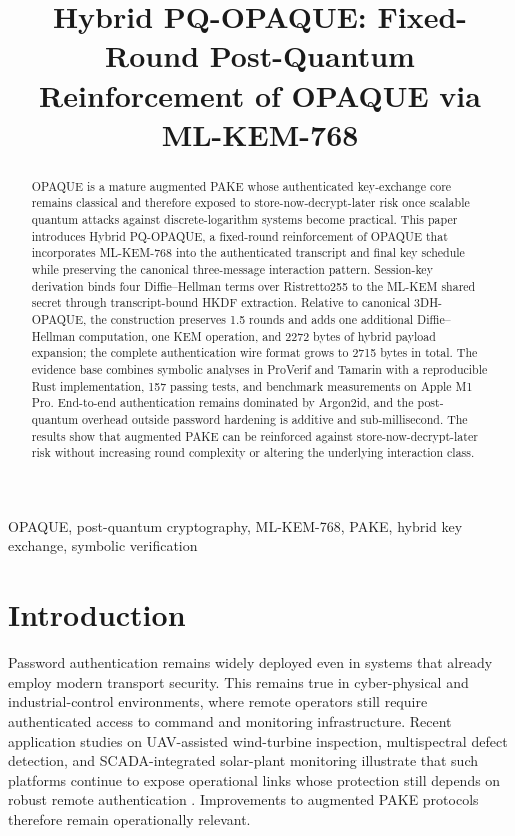 \documentclass[conference]{IEEEtran}
\begin{document}
\title{Hybrid PQ-OPAQUE: Fixed-Round Post-Quantum Reinforcement of OPAQUE via ML-KEM-768}

\author{
}

\maketitle

\begin{abstract}
OPAQUE is a mature augmented PAKE whose authenticated key-exchange core remains classical and therefore exposed to store-now-decrypt-later risk once scalable quantum attacks against discrete-logarithm systems become practical. This paper introduces Hybrid PQ-OPAQUE, a fixed-round reinforcement of OPAQUE that incorporates ML-KEM-768 into the authenticated transcript and final key schedule while preserving the canonical three-message interaction pattern. Session-key derivation binds four Diffie--Hellman terms over Ristretto255 to the ML-KEM shared secret through transcript-bound HKDF extraction. Relative to canonical 3DH-OPAQUE, the construction preserves 1.5 rounds and adds one additional Diffie--Hellman computation, one KEM operation, and 2272 bytes of hybrid payload expansion; the complete authentication wire format grows to 2715 bytes in total. The evidence base combines symbolic analyses in ProVerif and Tamarin with a reproducible Rust implementation, 157 passing tests, and benchmark measurements on Apple M1 Pro. End-to-end authentication remains dominated by Argon2id, and the post-quantum overhead outside password hardening is additive and sub-millisecond. The results show that augmented PAKE can be reinforced against store-now-decrypt-later risk without increasing round complexity or altering the underlying interaction class.
\end{abstract}

\begin{IEEEkeywords}
OPAQUE, post-quantum cryptography, ML-KEM-768, PAKE, hybrid key exchange, symbolic verification
\end{IEEEkeywords}

\section{Introduction}

Password authentication remains widely deployed even in systems that already employ modern transport security. This remains true in cyber-physical and industrial-control environments, where remote operators still require authenticated access to command and monitoring infrastructure. Recent application studies on UAV-assisted wind-turbine inspection, multispectral defect detection, and SCADA-integrated solar-plant monitoring illustrate that such platforms continue to expose operational links whose protection still depends on robust remote authentication \cite{en18071823,Svystun_Melnychenko_Radiuk_Savenko_Sachenko_Lysyi_2024,reksreks.2025.2.06}. Improvements to augmented PAKE protocols therefore remain operationally relevant.
\end{document}
